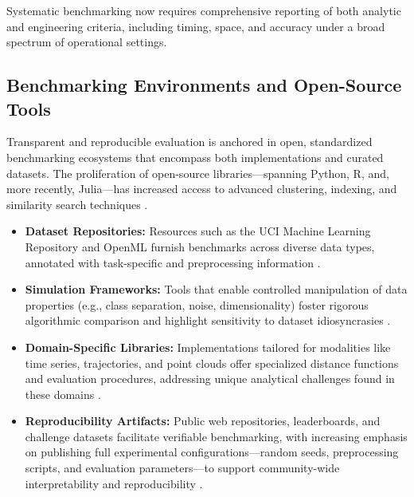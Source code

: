 \documentclass[sigconf]{acmart}
\begin{document}
Systematic benchmarking now requires comprehensive reporting of both analytic and engineering criteria, including timing, space, and accuracy under a broad spectrum of operational settings.

\subsection{Benchmarking Environments and Open-Source Tools}

Transparent and reproducible evaluation is anchored in open, standardized benchmarking ecosystems that encompass both implementations and curated datasets. The proliferation of open-source libraries—spanning Python, R, and, more recently, Julia—has increased access to advanced clustering, indexing, and similarity search techniques \cite{ref14, ref21, ref22, ref27, ref28, ref30, ref33, ref36, ref37, ref38, ref39, ref40, ref44, ref46, ref64, ref68, ref75, ref80, ref81, ref86, ref87, ref91, ref92, ref93, ref94, ref95, ref99, ref100, ref110}.

\begin{itemize}
    \item \textbf{Dataset Repositories:} Resources such as the UCI Machine Learning Repository and OpenML furnish benchmarks across diverse data types, annotated with task-specific and preprocessing information \cite{ref14, ref80, ref81, ref87, ref92, ref93}.
    \item \textbf{Simulation Frameworks:} Tools that enable controlled manipulation of data properties (e.g., class separation, noise, dimensionality) foster rigorous algorithmic comparison and highlight sensitivity to dataset idiosyncrasies \cite{ref33, ref99, ref100, ref110}.
    \item \textbf{Domain-Specific Libraries:} Implementations tailored for modalities like time series, trajectories, and point clouds offer specialized distance functions and evaluation procedures, addressing unique analytical challenges found in these domains \cite{ref75, ref92, ref93, ref94}.
    \item \textbf{Reproducibility Artifacts:} Public web repositories, leaderboards, and challenge datasets facilitate verifiable benchmarking, with increasing emphasis on publishing full experimental configurations—random seeds, preprocessing scripts, and evaluation parameters—to support community-wide interpretability and reproducibility \cite{ref14, ref44, ref64, ref80, ref81, ref91, ref95, ref99}.
\end{itemize}
\end{document}
